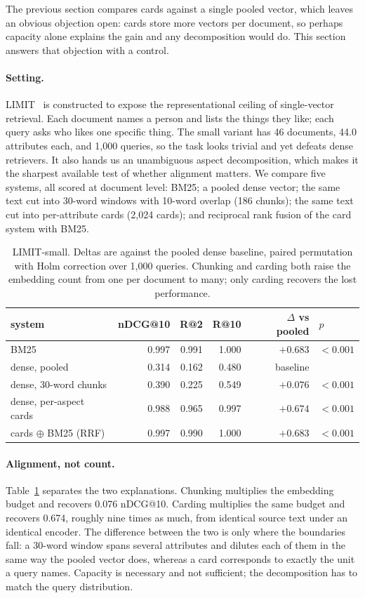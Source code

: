 The previous section compares cards against a single pooled vector, which leaves
an obvious objection open: cards store more vectors per document, so perhaps
capacity alone explains the gain and any decomposition would do. This section
answers that objection with a control.

\paragraph{Setting.}
LIMIT~\cite{weller2025limit} is constructed to expose the representational
ceiling of single-vector retrieval. Each document names a person and lists the
things they like; each query asks who likes one specific thing. The small variant
has 46 documents, 44.0 attributes each, and 1{,}000 queries, so the task looks
trivial and yet defeats dense retrievers. It also hands us an unambiguous aspect
decomposition, which makes it the sharpest available test of whether alignment
matters. We compare five systems, all scored at document level: BM25; a pooled
dense vector; the same text cut into 30-word windows with 10-word overlap
(186 chunks); the same text cut into per-attribute cards (2{,}024 cards); and
reciprocal rank fusion of the card system with BM25.

\begin{table}[t]
\caption{LIMIT-small. Deltas are against the pooled dense baseline, paired
permutation with Holm correction over 1{,}000 queries. Chunking and carding both
raise the embedding count from one per document to many; only carding recovers
the lost performance.}
\label{tab:limit}
\centering
\begin{tabular}{lrrrrl}
\toprule
system & nDCG@10 & R@2 & R@10 & $\Delta$ vs pooled & $p$ \\
\midrule
BM25                       & 0.997 & 0.991 & 1.000 & $+0.683$ & $<0.001$ \\
dense, pooled              & 0.314 & 0.162 & 0.480 & baseline & \\
dense, 30-word chunks      & 0.390 & 0.225 & 0.549 & $+0.076$ & $<0.001$ \\
dense, per-aspect cards    & 0.988 & 0.965 & 0.997 & $+0.674$ & $<0.001$ \\
cards $\oplus$ BM25 (RRF)  & 0.997 & 0.990 & 1.000 & $+0.683$ & $<0.001$ \\
\bottomrule
\end{tabular}
\end{table}

\paragraph{Alignment, not count.}
Table~\ref{tab:limit} separates the two explanations. Chunking multiplies the
embedding budget and recovers 0.076 nDCG@10. Carding multiplies the same budget
and recovers 0.674, roughly nine times as much, from identical source text under
an identical encoder. The difference between the two is only where the boundaries
fall: a 30-word window spans several attributes and dilutes each of them in the
same way the pooled vector does, whereas a card corresponds to exactly the unit a
query names. Capacity is necessary and not sufficient; the decomposition has to
match the query distribution.

